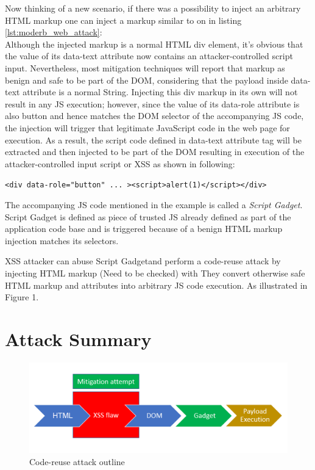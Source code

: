 Now thinking of a new scenario, if there was a possibility to inject an arbitrary HTML markup one can inject a markup similar to on in listing \ref{lst:moderb_web_attack}:
\\


Although the injected markup is a normal HTML div element, it’s obvious that the value of its data-text attribute now contains an attacker-controlled script input. Nevertheless, most mitigation techniques will report that markup as benign and safe to be part of the DOM, considering that the payload inside data-text attribute is a normal String. Injecting this div markup in its own will not result in any JS execution; however, since the value of its data-role attribute is also button and hence matches the DOM selector of the accompanying JS code, the injection will trigger that legitimate JavaScript code in the web page for execution. As a result, the script code defined in data-text attribute tag will be extracted and then injected to be part of the DOM resulting in execution of the attacker-controlled input script or XSS as shown in following:

\verb|<div data-role="button" ... ><script>alert(1)</script></div>|

The accompanying JS code mentioned in the example is called a \textit{Script Gadget}. Script Gadget is defined as piece of trusted JS already defined as part of the application code base and is triggered because of a benign HTML markup injection matches its selectors. 

XSS attacker can abuse Script Gadget\footnotemark and perform a code-reuse attack by injecting HTML markup (Need to be checked) with They convert otherwise safe HTML markup and attributes into arbitrary JS code execution. As illustrated in Figure 1.



\section{Attack Summary}

\begin{figure}
	\includegraphics[width=\linewidth]{figures/attack_outline}
	\caption{Code-reuse attack outline}
	\label{fig:gadget_attack_outline}
\end{figure}

